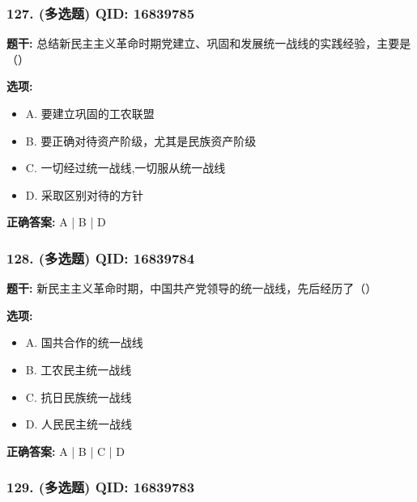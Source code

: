 \documentclass[12pt,UTF8]{ctexart}
\begin{document}
\subsubsection*{127. (多选题) \small QID: 16839785}

\textbf{题干:}
总结新民主主义革命时期党建立、巩固和发展统一战线的实践经验，主要是（）

\textbf{选项:}
\begin{itemize}[leftmargin=*]

  \item A. 要建立巩固的工农联盟

  \item B. 要正确对待资产阶级，尤其是民族资产阶级

  \item C. 一切经过统一战线,一切服从统一战线

  \item D. 采取区别对待的方针

\end{itemize}

\textbf{正确答案:}
A | B | D

\vspace{0.3em}\hrulefill\vspace{0.7em}

\subsubsection*{128. (多选题) \small QID: 16839784}

\textbf{题干:}
新民主主义革命时期，中国共产党领导的统一战线，先后经历了（）

\textbf{选项:}
\begin{itemize}[leftmargin=*]

  \item A. 国共合作的统一战线

  \item B. 工农民主统一战线

  \item C. 抗日民族统一战线

  \item D. 人民民主统一战线

\end{itemize}

\textbf{正确答案:}
A | B | C | D

\vspace{0.3em}\hrulefill\vspace{0.7em}

\subsubsection*{129. (多选题) \small QID: 16839783}
\end{document}
